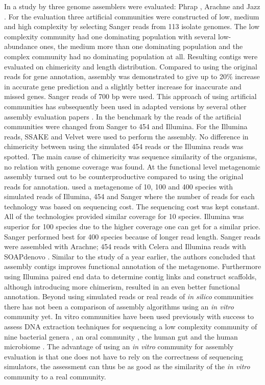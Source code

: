 In a study by \cite{Mavromatis17468765} three genome assemblers were
evaluated: Phrap \cite{delaBastide18428783}, Arachne \cite{Batzoglou11779843}
and Jazz \cite{Aparicio12142439}. For the evaluation three artificial
communities were constructed of low, medium and high complexity by selecting
Sanger reads from 113 isolate genomes. The low complexity community had one
dominating population with several low-abundance ones, the medium more than one
dominating population and the complex community had no dominating population at
all. Resulting contigs were evaluated on chimericity and length distribution.
Compared to using the original reads for gene annotation, assembly was
demonstrated to give up to 20\% increase in accurate gene prediction
and a slightly better increase for inaccurate and missed genes. Sanger reads of
700 bp were used. This approach of using artificial communities has
subsequently been used in adapted versions by several other assembly evaluation
papers \cite{Pignatelli21625384,Mende22384016}. In the benchmark by
\cite{Pignatelli21625384} the reads of the artificial communities were changed
from Sanger to 454 and Illumina. For the Illumina reads, SSAKE
\cite{Warren17158514} and Velvet were used to perform the assembly. No
difference in chimericity between using the simulated 454 reads or the Illumina
reads was spotted. The main cause of chimericity was sequence similarity of the
organisms, no relation with genome coverage was found. At the functional level
metagenomic assembly turned out to be counterproductive compared to using the
original reads for annotation. \cite{Mende22384016} used a metagenome of 10,
100 and 400 species with simulated reads of Illumina, 454 and Sanger where the
number of reads for each technology was based on sequencing cost. The
sequencing cost was kept constant. All of the technologies provided similar
coverage for 10 species. Illumina was superior for 100 species due to the
higher coverage one can get for a similar price.  Sanger performed best for 400
species because of longer read length. Sanger reads were assembled with
Arachne; 454 reads with Celera \cite{Myers10731133} and Illumina reads with
SOAPdenovo \cite{Li20019144}. Similar to the study of
\cite{Pignatelli21625384} a year earlier, the authors concluded that assembly
contigs improves functional annotation of the metagenome. Furthermore using
Illumina paired end data to determine contig links and construct scaffolds,
although introducing more chimerism, resulted in an even better functional
annotation.  Beyond using simulated reads or real reads of {\em in silico}
communities there has not been a comparison of assembly algorithms using an
{\em in vitro} community yet. In vitro communities have been used previously
with success to assess DNA extraction techniques for sequencing a low
complexity community of nine bacterial genera \cite{Willner22514642}, an oral
community \cite{Diaz22520388}, the human gut \cite{Wu20673359} and the human
microbiome \cite{HMPC22699610}.  The advantage of using an {\em in vitro}
community for assembly evaluation is that one does not have to rely on the
correctness of sequencing simulators, the assessment can thus be as good as the
similarity of the {\em in vitro } community to a real community.

